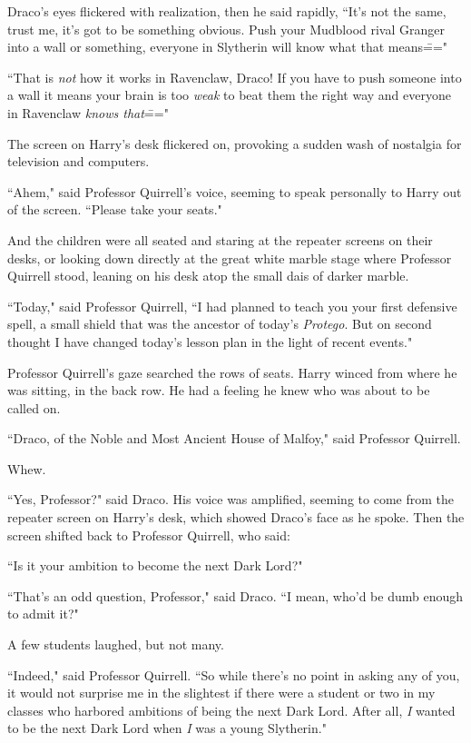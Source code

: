 Draco's eyes flickered with realization, then he said rapidly, ``It's not the same, trust me, it's got to be something obvious. Push your Mudblood rival Granger into a wall or something, everyone in Slytherin will know what that means\==="

``That is \emph{not} how it works in Ravenclaw, Draco! If you have to push someone into a wall it means your brain is too \emph{weak} to beat them the right way and everyone in Ravenclaw \emph{knows that}\==="

The screen on Harry's desk flickered on, provoking a sudden wash of nostalgia for television and computers.

``Ahem," said Professor Quirrell's voice, seeming to speak personally to Harry out of the screen. ``Please take your seats."

\later

And the children were all seated and staring at the repeater screens on their desks, or looking down directly at the great white marble stage where Professor Quirrell stood, leaning on his desk atop the small dais of darker marble.

``Today," said Professor Quirrell, ``I had planned to teach you your first defensive spell, a small shield that was the ancestor of today's \emph{Protego}. But on second thought I have changed today's lesson plan in the light of recent events."

Professor Quirrell's gaze searched the rows of seats. Harry winced from where he was sitting, in the back row. He had a feeling he knew who was about to be called on.

``Draco, of the Noble and Most Ancient House of Malfoy," said Professor Quirrell.

Whew.

``Yes, Professor?" said Draco. His voice was amplified, seeming to come from the repeater screen on Harry's desk, which showed Draco's face as he spoke. Then the screen shifted back to Professor Quirrell, who said:

``Is it your ambition to become the next Dark Lord?"

``That's an odd question, Professor," said Draco. ``I mean, who'd be dumb enough to admit it?"

A few students laughed, but not many.

``Indeed," said Professor Quirrell. ``So while there's no point in asking any of you, it would not surprise me in the slightest if there were a student or two in my classes who harbored ambitions of being the next Dark Lord. After all, \emph{I} wanted to be the next Dark Lord when \emph{I} was a young Slytherin."

